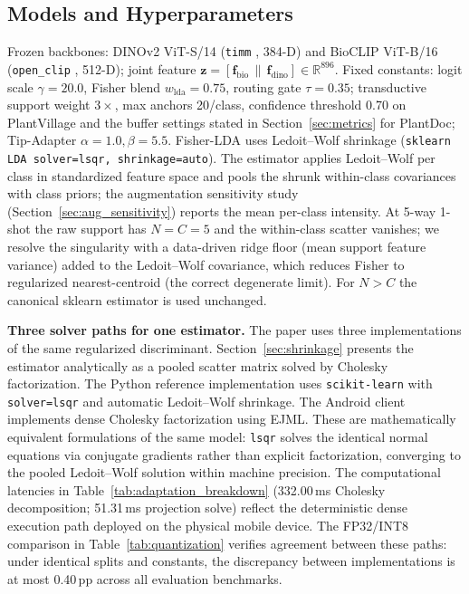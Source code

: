 \documentclass[preprint,12pt]{elsarticle}
\begin{document}
\subsection{Models and Hyperparameters}
Frozen backbones: DINOv2 ViT-S/14 (\texttt{timm} , 384-D) and BioCLIP ViT-B/16 (\texttt{open\_clip} , 512-D); joint feature $\mathbf{z}=[\mathbf{f}_{\text{bio}}\,\|\,\mathbf{f}_{\text{dino}}]\in\mathbb{R}^{896}$. Fixed constants: logit scale $\gamma=20.0$, Fisher blend $w_{\text{lda}}=0.75$, routing gate $\tau=0.35$; transductive support weight $3\times$, max anchors 20/class, confidence threshold 0.70 on PlantVillage and the buffer settings stated in Section~\ref{sec:metrics} for PlantDoc; Tip-Adapter $\alpha=1.0,\beta=5.5$. Fisher-LDA uses Ledoit--Wolf shrinkage (\texttt{sklearn LDA solver=lsqr, shrinkage=auto}). The estimator applies Ledoit--Wolf per class in standardized feature space and pools the shrunk within-class covariances with class priors; the augmentation sensitivity study (Section~\ref{sec:aug_sensitivity}) reports the mean per-class intensity. At 5-way 1-shot the raw support has $N=C=5$ and the within-class scatter vanishes; we resolve the singularity with a data-driven ridge floor (mean support feature variance) added to the Ledoit--Wolf covariance, which reduces Fisher to regularized nearest-centroid (the correct degenerate limit). For $N>C$ the canonical sklearn estimator is used unchanged.

\textbf{Three solver paths for one estimator.} The paper uses three implementations of the same regularized discriminant. Section~\ref{sec:shrinkage} presents the estimator analytically as a pooled scatter matrix solved by Cholesky factorization. The Python reference implementation uses \texttt{scikit-learn} with \texttt{solver=lsqr} and automatic Ledoit--Wolf shrinkage. The Android client implements dense Cholesky factorization using EJML. These are mathematically equivalent formulations of the same model: \texttt{lsqr} solves the identical normal equations via conjugate gradients rather than explicit factorization, converging to the pooled Ledoit--Wolf solution within machine precision. The computational latencies in Table~\ref{tab:adaptation_breakdown} (332.00\,ms Cholesky decomposition; 51.31\,ms projection solve) reflect the deterministic dense execution path deployed on the physical mobile device. The FP32/INT8 comparison in Table~\ref{tab:quantization} verifies agreement between these paths: under identical splits and constants, the discrepancy between implementations is at most 0.40\,pp across all evaluation benchmarks.
\end{document}
